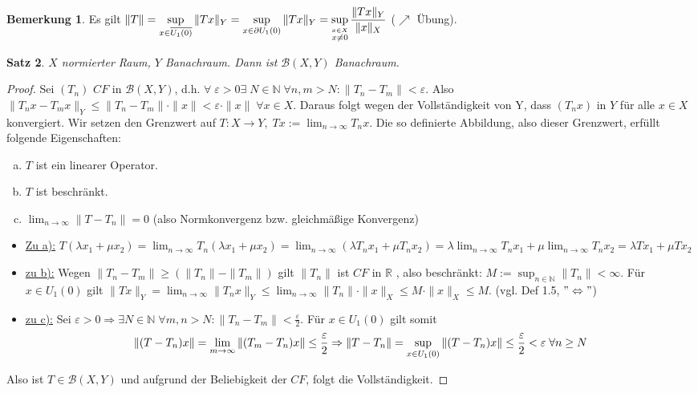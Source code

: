 \documentclass[ngerman]{report}
\theoremstyle{plain}%
\newtheorem{thm}{Satz}[chapter]
\theoremstyle{definition}%
\theoremstyle{myStyle}
\newtheorem{bem}[thm]{Bemerkung}
\newcommand{\R}{\mathbb{R}}
\newcommand{\N}{\mathbb{N}}
\newcommand{\BS}[1][X,Y]{\mathcal{B}(#1)} %
\newcommand{\norm}[1]{\|#1\|}
\newcommand{\df}[1][]{%
	\overset{#1}{\Rightarrow}
}
\newcommand{\aq}{\Leftrightarrow} %
\newcommand{\U}[2][1]{U_{#1}(#2)} %
\newcommand{\EK}{\U{0}} %
\newcommand{\limes}[1][\infty]{\lim_{n \to #1}}
\newcommand{\supT}[1][a]{
	\IfEqCase{#1}{
	{A}{\sup_{x \in \overline{\EK}}} 
	{R}{\sup_{x \in \partial\EK}}
	{a}{\sup_{x \in \EK}}
	}
} %
\newcommand{\disp}{\displaystyle}
\begin{document}
	\begin{bem}
		Es gilt 
		$\disp \norm{T} = \supT[A]\norm{Tx}_Y = \supT[R] \norm{Tx}_Y
		= \sup_{\overset{x \in X}{x \not = 0}} \frac{\norm{Tx}_Y}{\norm{x}_X}$
		($\nearrow$ Übung).
	\end{bem}
	\begin{thm}
		$X$ normierter Raum, $Y$ Banachraum. Dann ist $\BS$ Banachraum.
	\end{thm}
		\begin{proof}
			Sei $(T_n)$ $CF$ in $\BS$, d.h. 
			$\forall \; \varepsilon > 0 \exists \; N\in \N \; \forall n,m > N: \norm{T_n - T_m} < \varepsilon$.		
			Also $\norm{T_nx - T_mx}_Y \leq \norm{T_n - T_m} \cdot \norm{x} < \varepsilon \cdot \norm{x} \; \forall x\in X$. 
			Daraus folgt wegen der Vollständigkeit von Y, dass $(T_nx)$ in $Y$ für alle $x\in X$ konvergiert.
			Wir setzen den Grenzwert auf $\disp T: X\to Y,\; Tx := \limes T_nx$. Die so definierte Abbildung, also dieser Grenzwert, erfüllt folgende Eigenschaften: 
				\begin{enumerate}[a)]
					\item $T$ ist ein linearer Operator.
					\item $T$ ist beschränkt.
					\item $\disp \limes \norm{T - T_n} = 0$ (also Normkonvergenz bzw. gleichmäßige Konvergenz)
				\end{enumerate}
				\begin{itemize}[]
					\item \underline{Zu a):} 
						$\disp T(\lambda x_1 + \mu x_2) = \limes T_n(\lambda x_1 + \mu x_2) 
						= \limes (\lambda T_n x_1 + \mu T_n x_2) = \lambda \limes T_nx_1 + \mu \limes T_n x_2
						= \lambda T x_1 + \mu T x_2$
					\item \underline{zu b):}
						Wegen $\norm{T_n - T_m} \geq (\norm{T_n} - \norm{T_m})$ gilt $\norm{T_n}$ ist $CF$ in $\R$
						, also beschränkt: $\disp M := \sup_{n\in\N} \norm{T_n} < \infty$. 
						Für $x\in\EK$ gilt $\disp \norm{Tx}_Y = \limes \norm{T_nx}_Y 
						\leq \limes \norm{T_n} \cdot \norm{x}_X \leq M\cdot \norm{x}_X \leq M$. (vgl. Def 1.5, $"\aq"$)
					\item \underline{zu c):}
						Sei $\varepsilon > 0 \df \exists N\in\N \; \forall m,n > N: \norm{T_n - T_m} < \frac{\varepsilon}{2}.$
						Für $x\in \EK$ gilt somit %
						$$\disp \norm{(T-T_n)x} =\lim_{m\to \infty} \norm{(T_m - T_n)x} \leq \frac{\varepsilon}{2}
						\disp \df \norm{T - T_n} = \supT \norm{(T-T_n)x} \leq \frac{\varepsilon}{2} < \varepsilon \; \forall n \geq N$$
						
				\end{itemize}
				Also ist $T\in \BS$ und aufgrund der Beliebigkeit der $CF$, folgt die Vollständigkeit.
		\end{proof}
\end{document}

